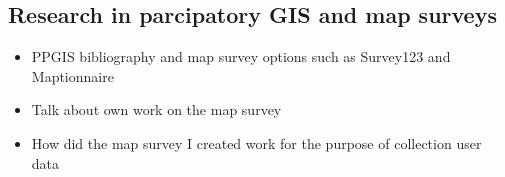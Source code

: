 \newpage
\subsection{Research in parcipatory GIS and map surveys}
\justify

\begin{itemize}
  \item PPGIS bibliography and map survey options such as Survey123 and Maptionnaire
  \item Talk about own work on the map survey
  \item How did the map survey I created work for the purpose of collection user data
\end{itemize}